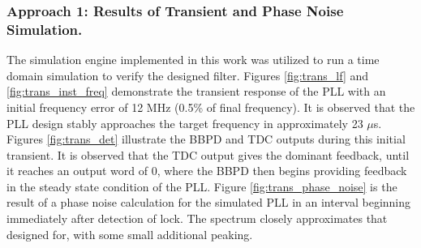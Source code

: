 \subsubsection{Approach 1: Results of Transient and Phase Noise Simulation.}
The simulation engine implemented in this work was utilized to run a time domain simulation to verify the designed filter. Figures \ref{fig:trans_lf} and \ref{fig:trans_inst_freq} demonstrate the transient response of the PLL with an initial frequency error of 12 MHz (0.5\% of final frequency). It is observed that the PLL design stably approaches the target frequency in approximately 23 $\mu$s. Figures \ref{fig:trans_det} illustrate the BBPD and TDC outputs during this initial transient. It is observed that the TDC output gives the dominant feedback, until it reaches an output word of 0, where the BBPD then begins providing feedback in the steady state condition of the PLL. Figure \ref{fig:trans_phase_noise} is the result of a phase noise calculation for the simulated PLL in an interval beginning immediately after detection of lock. The spectrum closely approximates that designed for, with some small additional peaking.
